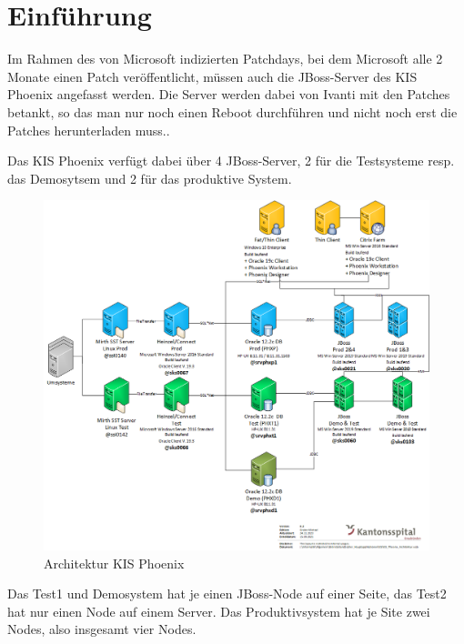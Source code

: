 
\chapter{Einführung}
\begin{flushleft}
    Im Rahmen des von Microsoft indizierten Patchdays, bei dem Microsoft alle 2 Monate einen Patch veröffentlicht, müssen auch die \Gls{JBoss}-Server des KIS Phoenix angefasst werden.
    Die Server werden dabei von \Gls{Ivanti} mit den Patches betankt, so das man nur noch einen Reboot durchführen und nicht noch erst die Patches herunterladen muss..
\end{flushleft}
\begin{flushleft}
    Das KIS Phoenix verfügt dabei über 4 JBoss-Server, 2 für die Testsysteme resp.
    das Demosytsem und 2 für das produktive System.
    \begin{figure}[H]
        \centering
        \includegraphics[width=1\linewidth]{source/introduction/KIS_Phoenix_Architektur}
        \caption{Architektur KIS Phoenix\cite{KFDFYH5H}}
        \label{fig:architektur-kis-phoenix}
    \end{figure}
\end{flushleft}
\begin{flushleft}
    Das Test1 und Demosystem hat je einen JBoss-Node auf einer Seite, das Test2 hat nur einen Node auf einem Server.
    Das Produktivsystem hat je Site zwei Nodes, also insgesamt vier Nodes.
\end{flushleft}
